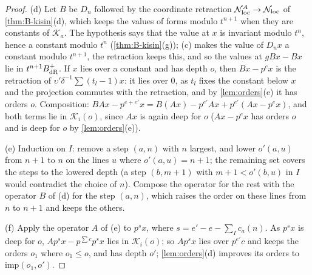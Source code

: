 \begin{proof}
(d) Let $B$ be $D_n$ followed by the coordinate retraction $\mathcal N^A_{\rm loc}\to\mathcal N_{\rm loc}$ of \cref{thm:B-kisin}(d), which keeps the values of forms modulo $t^{n+1}$ when they are constants of $\mathcal K_a$. The hypothesis says that the value at $x$ is invariant modulo $t^n$, hence a constant
modulo $t^n$ (\cref{thm:B-kisin}(g)); (c) makes the value of $D_nx$ a constant modulo $t^{n+1}$, the retraction keeps this, and so the values at $gBx-Bx$ lie in $t^{n+1}B_{\rm dR}^+$. If $x$ lies over a constant and has depth $o$, then $Bx-p^cx$ is the retraction of $\upsilon'\delta^{-1}\sum(t_l-1)x$: it lies over $0$, as $t_l$ fixes the constant
below $x$ and the projection commutes with the retraction, and by \cref{lem:orders}(e) it has orders $o$. Composition: $BA x-p^{e+e'}x=B(Ax)-p^{e'}Ax+p^{e'}(Ax-p^ex)$, and both terms lie in $\mathcal K_i(o)$, since $Ax$ is again deep for $o$ ($Ax-p^ex$ has orders $o$ and
is deep for $o$ by \cref{lem:orders}(e)).

(e) Induction on $I$: remove a step $(a,n)$ with $n$ largest, and lower $o'(a,u)$ from $n+1$ to $n$ on the lines $u$ where $o'(a,u)=n+1$; the remaining set covers the steps to the lowered depth (a step $(b,m+1)$ with $m+1<o'(b,u)$ in $I$ would contradict the choice of $n$). Compose the operator for the rest
with the operator $B$ of (d) for the step $(a,n)$, which raises the order on these lines from $n$ to $n+1$ and keeps the others.

(f) Apply the operator $A$ of (e) to $p^{s}x$, where $s=e'-e-\sum_Ic_a(n)$. As $p^sx$ is deep for $o$, $Ap^sx-p^{\sum c}p^sx$ lies in $\mathcal K_i(o)$; so $Ap^sx$ lies over $p^{e'}c$ and keeps the orders $o_1$ where $o_1\le o$, and has depth $o'$; \cref{lem:orders}(d) improves its orders
to $\mathrm{imp}(o_1,o')$.
\end{proof}

